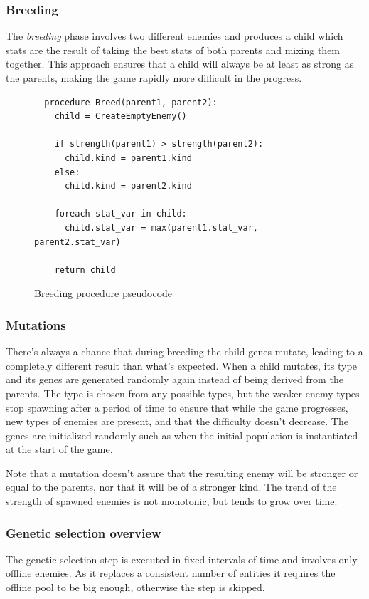 \documentclass[11pt]{article}
\begin{document}
\pagebreak

\subsubsection{Breeding}
The \textit{breeding} phase involves two different enemies and produces a child which stats are the result of taking the best stats of both parents and mixing them together.
This approach ensures that a child will always be at least as strong as the parents, making the game rapidly more difficult in the progress.

\begin{figure}[H]
  \begin{lstlisting}
  procedure Breed(parent1, parent2):
    child = CreateEmptyEnemy()

    if strength(parent1) > strength(parent2):
      child.kind = parent1.kind
    else:
      child.kind = parent2.kind

    foreach stat_var in child:
      child.stat_var = max(parent1.stat_var, parent2.stat_var)

    return child 
  \end{lstlisting}
  \caption{Breeding procedure pseudocode}
\end{figure}

\subsubsection{Mutations}
There’s always a chance that during breeding the child genes mutate, leading to a completely different result than what’s expected. When a child mutates, its type and its genes are generated randomly again instead of being derived from the parents. The type is chosen from any possible types, but the weaker enemy types stop spawning after a period of time to ensure that while the game progresses, new types of enemies are present, and that the difficulty doesn’t decrease. The genes are initialized randomly such as when the initial population is instantiated at the start of the game.

Note that a mutation doesn’t assure that the resulting enemy will be stronger or equal to the parents, nor that it will be of a stronger kind. The trend of the strength of spawned enemies is not monotonic, but tends to grow over time.

\subsubsection{Genetic selection overview}
The genetic selection step is executed in fixed intervals of time and involves only offline enemies. As it replaces a consistent number of entities it requires the offline pool to be big enough, otherwise the step is skipped.
\end{document}
